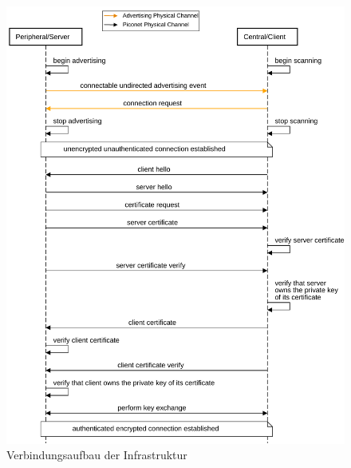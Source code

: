 \begin{figure}[H]
    \centering
    \includegraphics[width=1.05\textwidth]{graphics/infra_verb_aufbau.pdf}
    \caption[Verbindungsaufbau der Infrastruktur]{Verbindungsaufbau der Infrastruktur}
    \label{fig: infra verb aufbau}
\end{figure}